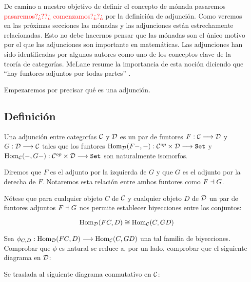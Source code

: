 De camino a nuestro objetivo de definir el concepto de mónada
pasaremos \textcolor{red}{pasaremos?¿??¿ comenzamos?¿?¿} por la definición de adjunción. Como veremos en las próximas
secciones las mónadas y las adjunciones están estrechamente relacionadas.
Esto no debe hacernos pensar que las mónadas son el único motivo
por el que las adjunciones son importante en matemáticas. Las adjunciones
han sido identificadas por algunos autores como uno de los conceptos
clave de la teoría de categorías. McLane resume la importancia de
esta noción diciendo que ``hay funtores adjuntos por todas partes''
\cite{ariseeverywhere}.

Empezaremos por precisar qué es una adjunción.

\subsection{Definición}
\begin{definition}
  Una adjunción entre categorías $\mathcal{C}$ y $\mathcal{D}$ es un par de funtores
  $F : \mathcal{C}\longrightarrow \mathcal{D}$ y $G: \mathcal{D}\longrightarrow \mathcal{C}$ tales que los funtores
  $\operatorname{Hom}_{\mathcal{D}}(F-, -) : \mathcal{C}^{op}\times\mathcal{D}\longrightarrow \texttt{Set}$ y
  $\operatorname{Hom}_{\mathcal{C}}(-, G-) : \mathcal{C}^{op}\times\mathcal{D}\longrightarrow \texttt{Set}$ son naturalmente isomorfos.

  Diremos que $F$ es el
  adjunto por la izquierda de $G$ y que $G$ es el adjunto
  por la derecha de $F$. Notaremos esta relación entre ambos funtores
  como $F \dashv G$.
\end{definition}

Nótese que para cualquier
objeto $C$ de $\mathcal{C}$ y cualquier objeto
$D$ de $\mathcal{D}$ un par de funtores adjuntos $F \dashv G$ nos permite
establecer biyecciones entre los conjuntos:

$$\operatorname{Hom}_{\mathcal{D}}(FC, D) \cong \operatorname{Hom}_{\mathcal{C}}(C, GD)$$

Sea $\phi_{C, D} : \operatorname{Hom}_{\mathcal{D}}(FC, D)\longrightarrow \operatorname{Hom}_{\mathcal{C}}(C, GD)$ una tal
familia de biyecciones. Comprobar que $\phi$ es natural se reduce
a, por un lado, comprobar que el siguiente diagrama en $\mathcal{D}$:

\begin{center}
\end{center}

Se traslada al siguiente diagrama conmutativo en $\mathcal{C}$:

\begin{center}
\end{center}

